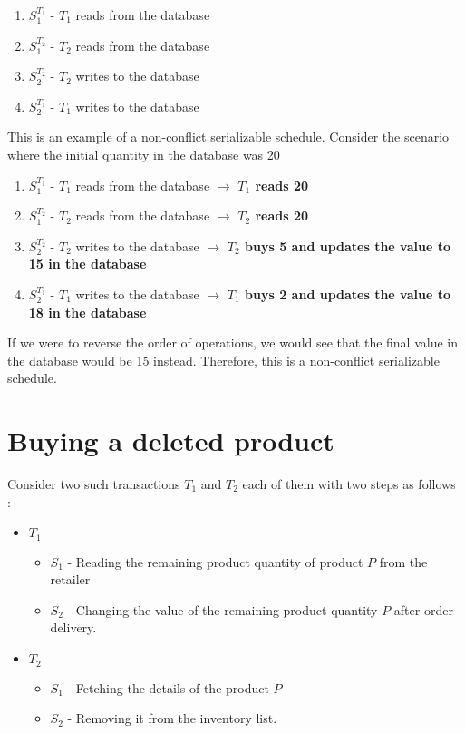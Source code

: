 \documentclass[12pt]{article}
\begin{document}
\begin{enumerate}
    \item $S_1^{T_1}$ - $T_1$ reads from the database
    \item $S_1^{T_2}$ - $T_2$ reads from the database
    \item $S_2^{T_2}$ - $T_2$ writes to the database
    \item $S_2^{T_1}$ - $T_1$ writes to the database
\end{enumerate}

This is an example of a non-conflict serializable schedule. Consider the scenario where the initial quantity in the database was 20

\begin{enumerate}
    \item $S_1^{T_1}$ - $T_1$ reads from the database $\rightarrow$ \textbf{$T_1$ reads 20 }
    \item $S_1^{T_2}$ - $T_2$ reads from the database $\rightarrow$ \textbf{$T_2$ reads 20}
    \item $S_2^{T_2}$ - $T_2$ writes to the database $\rightarrow$  \textbf{$T_2$ buys 5 and updates the value to 15 in the database}
    \item $S_2^{T_1}$ - $T_1$ writes to the database $\rightarrow$  \textbf{$T_1$ buys 2 and updates the value to 18 in the database}
\end{enumerate}

If we were to reverse the order of operations, we would see that the final value in the database would be 15 instead. Therefore, this is a non-conflict serializable schedule.


\section{Buying a deleted product}

Consider two such transactions $T_1$ and $T_2$ each of them with two steps as follows :-
\begin{itemize}[noitemsep]
    \item $T_1$
    \begin{itemize}[noitemsep]
        \item $S_1$ - Reading the remaining product quantity of product $P$ from the retailer
        \item $S_2$ - Changing the value of the remaining product quantity $P$ after order delivery.
    \end{itemize}
    \item $T_2$
    \begin{itemize}[noitemsep]
        \item $S_1$ - Fetching the details of the product $P$
        \item $S_2$ - Removing it from the inventory list. 
    \end{itemize}
\end{itemize}
\end{document}

